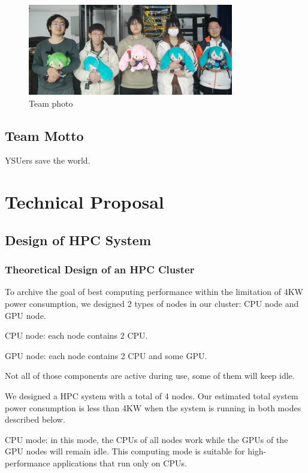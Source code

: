 \documentclass[a4paper,12pt]{article}
\begin{document}
\begin{figure}[H]
    \centering
    \includegraphics[width=0.8\textwidth]{Team_Photo.png}
    \caption{Team photo}
    \label{fig:team_photo}
\end{figure}


\subsection{Team Motto}

YSUers save the world.

\newpage

\section{Technical Proposal}

\subsection{Design of HPC System}

\subsubsection{Theoretical Design of an HPC Cluster}

To archive the goal of best computing performance within the limitation of 4KW power consumption, we designed 2 types of nodes in our cluster: CPU node and GPU node.

CPU node: each node contains 2 CPU.

GPU node: each node contains 2 CPU and some GPU.

Not all of those components are active during use, some of them will keep idle.

We designed a HPC system with a total of 4 nodes. Our estimated total system power consumption is less than 4KW when the system is running in both modes described below.

CPU mode: in this mode, the CPUs of all nodes work while the GPUs of the GPU nodes will remain idle. This computing mode is suitable for high-performance applications that run only on CPUs.
\end{document}
